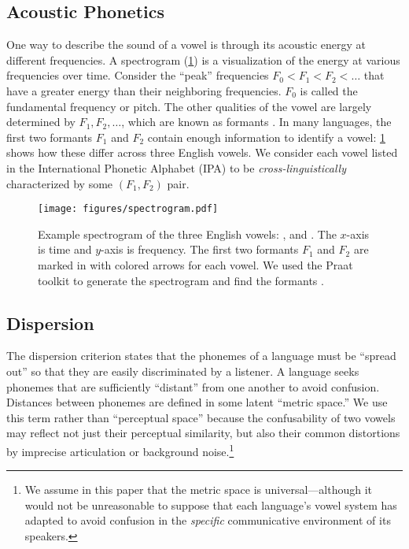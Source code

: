 \documentclass[11pt,a4paper]{article}
\renewcommand{\cite}[2][]{\citep[#1]{#2}}
\newcommand{\phone}[1]{\textipa{[#1]}}
\begin{document}
\subsection{Acoustic Phonetics}

One way to describe the sound of a vowel is through its acoustic energy at
different frequencies.  A spectrogram
(\cref{fig:spectrogram}) is a visualization of the energy at various
frequencies over time.  Consider the ``peak'' frequencies $F_0 < F_1 < F_2 < \ldots$
that have a greater energy than their neighboring frequencies.  
$F_0$ is called the fundamental frequency or pitch.  The other qualities of the vowel are largely determined by $F_1, F_2, \ldots$, which are known as formants \cite{ladefoged}.
In many languages, the first two formants
$F_1$ and $F_2$ contain enough information to identify a vowel:
\cref{fig:spectrogram} shows how these differ across three English vowels.
We consider each vowel listed in the International Phonetic
Alphabet (IPA) to be {\em cross-linguistically} characterized by some $(F_1,F_2)$ pair.

\begin{figure}
  \centering
  \texttt{[image: figures/spectrogram.pdf]}
  \caption{Example spectrogram of the three English vowels: \phone{i}, \phone{u} and \phone{A}. The $x$-axis is time and $y$-axis is frequency. The first two formants $F_1$ and $F_2$
    are marked in with colored arrows for each vowel. We used the Praat toolkit to generate the spectrogram
  and find the formants \cite{boersma2002praat}.}
\label{fig:spectrogram}
\end{figure}

\subsection{Dispersion}\label{sec:dispersion}

The dispersion criterion \cite{liljencrants1972numerical,lindblom1986phonetic} states that the phonemes of a
language must be ``spread out'' so that they are easily
discriminated by a listener. 
A language seeks phonemes that are sufficiently ``distant'' from one another to
avoid confusion.
Distances between phonemes are defined in some latent ``metric space.''  We use this term rather than ``perceptual space'' because the confusability of two vowels may reflect not just their perceptual similarity, but also their common distortions by imprecise articulation or background noise.\footnote{We assume in this paper that the metric space is universal---although it would not be unreasonable to suppose that each language's vowel system has adapted to avoid confusion in the {\em specific} communicative environment of its speakers.}
\end{document}
